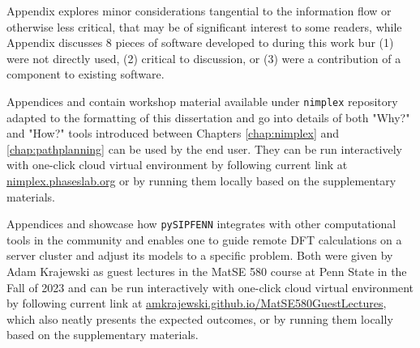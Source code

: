 Appendix  explores minor considerations tangential to the information flow or otherwise less critical, that may be of significant interest to some readers, while Appendix  discusses 8 pieces of software developed to during this work bur (1) were not directly used, (2) critical to discussion, or (3) were a contribution of a component to existing software.

Appendices  and  contain workshop material available under \texttt{nimplex} repository adapted to the formatting of this dissertation and go into details of both "Why?" and "How?" tools introduced between Chapters \ref{chap:nimplex} and \ref{chap:pathplanning} can be used by the end user. They can be run interactively with one-click cloud virtual environment by following current link at \href{https://nimplex.phaseslab.org}{nimplex.phaseslab.org} or by running them locally based on the supplementary materials.

Appendices  and  showcase how \texttt{pySIPFENN} integrates with other computational tools in the community and enables one to guide remote DFT calculations on a server cluster and adjust its models to a specific problem. Both were given by Adam Krajewski as guest lectures in the MatSE 580 course at Penn State in the Fall of 2023 and can be run interactively with one-click cloud virtual environment by following current link at \href{https://amkrajewski.github.io/MatSE580GuestLectures}{amkrajewski.github.io/MatSE580GuestLectures}, which also neatly presents the expected outcomes, or by running them locally based on the supplementary materials.

\printbibliography[heading=subbibintoc]